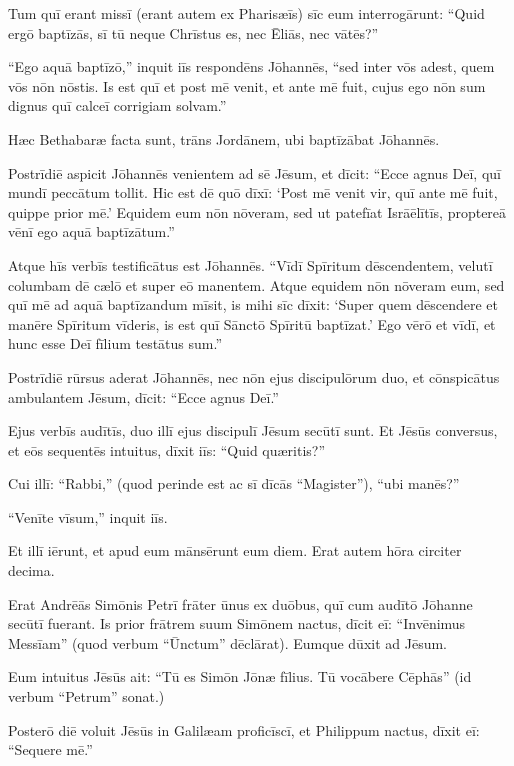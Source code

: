 \Versus Tum quī erant missī (erant autem ex Pharisæīs) sīc eum interrogārunt:
\Versus ``Quid ergō baptīzās, sī tū neque Chrīstus es, nec Ēliās, nec vātēs?''

\Versus ``Ego aquā baptīzō,'' inquit iīs respondēns Jōhannēs, ``sed inter vōs adest, quem vōs nōn nōstis.
\Versus Is est quī et post mē venit, et ante mē fuit, cujus ego nōn sum dignus quī calceī corrigiam solvam.''

\Versus Hæc Bethabaræ facta sunt, trāns Jordānem, ubi baptīzābat Jōhannēs.

\Versus Postrīdiē aspicit Jōhannēs venientem ad sē Jēsum, et dīcit: ``Ecce agnus Deī, quī mundī peccātum tollit.
\Versus Hic est dē quō dīxī: `Post mē venit vir, quī ante mē fuit, quippe prior mē.'
\Versus Equidem eum nōn nōveram, sed ut patefīat Isrāēlītīs, proptereā vēnī ego aquā baptīzātum.''

\Versus Atque hīs verbīs testificātus est Jōhannēs. ``Vīdī Spīritum dēscendentem, velutī columbam dē cælō et super eō manentem.
\Versus Atque equidem nōn nōveram eum, sed quī mē ad aquā baptīzandum mīsit, is mihi sīc dīxit: `Super quem dēscendere et manēre Spīritum vīderis, is est quī Sānctō Spīritū baptīzat.'
\Versus Ego vērō et vīdī, et hunc esse Deī fīlium testātus sum.''

\Versus Postrīdiē rūrsus aderat Jōhannēs, nec nōn ejus discipulōrum duo,
\Versus et cōnspicātus ambulantem Jēsum, dīcit: ``Ecce agnus Deī.''

\Versus Ejus verbīs audītīs, duo illī ejus discipulī Jēsum secūtī sunt.
\Versus Et Jēsūs conversus, et eōs sequentēs intuitus, dīxit iīs: ``Quid quæritis?''

Cui illī: ``Rabbi,'' (quod perinde est ac sī dīcās ``Magister''), ``ubi manēs?''

\Versus ``Venīte vīsum,'' inquit iīs.

Et illī iērunt, et apud eum mānsērunt eum diem. Erat autem hōra circiter decima.

\Versus Erat Andrēās Simōnis Petrī frāter ūnus ex duōbus, quī cum audītō Jōhanne secūtī fuerant.
\Versus Is prior frātrem suum Simōnem nactus, dīcit eī: ``Invēnimus Messīam'' (quod verbum ``Ūnctum'' dēclārat).
\Versus Eumque dūxit ad Jēsum.

Eum intuitus Jēsūs ait: ``Tū es Simōn Jōnæ fīlius. Tū vocābere Cēphās'' (id verbum ``Petrum'' sonat.)

\Versus Posterō diē voluit Jēsūs in Galilæam proficīscī, et Philippum nactus, dīxit eī: ``Sequere mē.''

